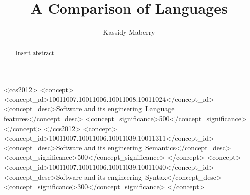 \documentclass[sigconf, nonacm, authorversion, language=english, 12pt]{acmart}
\begin{document}
\title{A Comparison of Languages}


\author{Kassidy Maberry}



\newcommand{\PLtitle}{\setlength{\parindent}{0pt}
  \twocolumn[{%
        \begin{center}
          \huge\textbf{A Comparison of Languages}\\
          \normalsize A Comparision between C++, Python, and Java.\\

          \begin{singlespace}


            Name: Kassidy Maberry\\
            Department of Computer Science and Engineering\\
            New Mexico Institue of Mining and Technology\\
            Socorro, New Mexico, USA\\
            kassidy.maberry@student.nmt.edu\\
            \bigskip
            \bigskip
          \end{singlespace}
        \end{center}
      }]
}

\begin{abstract}
  Insert abstract
\end{abstract}


\begin{CCSXML}
  <ccs2012>
  <concept>
  <concept_id>10011007.10011006.10011008.10011024</concept_id>
  <concept_desc>Software and its engineering~Language features</concept_desc>
  <concept_significance>500</concept_significance>
  </concept>
  </ccs2012>
  <concept>
  <concept_id>10011007.10011006.10011039.10011311</concept_id>
  <concept_desc>Software and its engineering~Semantics</concept_desc>
  <concept_significance>500</concept_significance>
  </concept>
  <concept>
  <concept_id>10011007.10011006.10011039.10011040</concept_id>
  <concept_desc>Software and its engineering~Syntax</concept_desc>
  <concept_significance>300</concept_significance>
  </concept>
\end{CCSXML}
\end{document}
